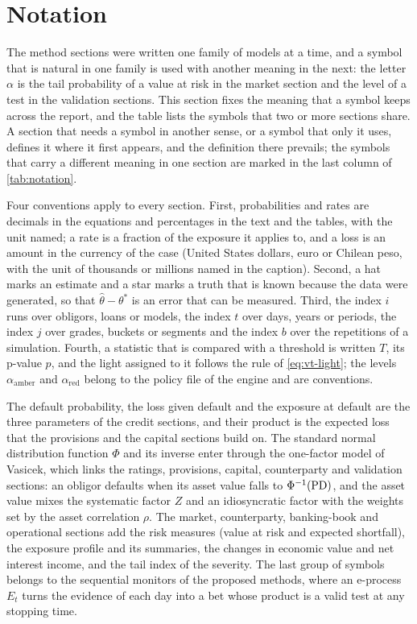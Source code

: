 \section{Notation}
\label{sec:notation}

The method sections were written one family of models at a time, and a symbol that is natural in one family is used with another meaning in the next:
the letter $\alpha$ is the tail probability of a value at risk in the market section and the level of a test in the validation sections. This section fixes the meaning that a symbol keeps across the report, and the table lists the symbols that two or more sections share. A section that
needs a symbol in another sense, or a symbol that only it uses, defines it where it first appears, and the definition there prevails; the symbols that carry a
different meaning in one section are marked in the last column of \cref{tab:notation}.

Four conventions apply to every section. First, probabilities and rates are decimals in the equations and percentages in the text and the tables, with the unit named; a
rate is a fraction of the exposure it applies to, and a loss is an amount in the currency of the case (United States dollars, euro or Chilean peso, with the unit of thousands or millions
named in the caption). Second, a hat marks an estimate and a star marks a truth that is known because the data were generated, so that $\hat\theta-\theta^\ast$ is an error that can be
measured. Third, the index $i$ runs over obligors, loans or models, the index $t$ over days, years or periods, the index $j$ over grades, buckets or segments and the index $b$ over
the repetitions of a simulation. Fourth, a statistic that is compared with a threshold is written $T$, its p-value $p$, and the light assigned to it follows
the rule of \cref{eq:vt-light}; the levels $\alpha_{\mathrm{amber}}$ and $\alpha_{\mathrm{red}}$ belong to the policy file of the engine and are conventions.

The default probability, the loss given default and the exposure at default are the three parameters of the credit sections, and their product is the expected loss that the
provisions and the capital sections build on. The standard normal distribution function $\Phi$ and its inverse enter through the one-factor model of Vasicek, which links the
ratings, provisions, capital, counterparty and validation sections: an obligor defaults when its asset value falls to $\Phi^{-1}(\mathrm{PD})$, and the asset value mixes the systematic
factor $Z$ and an idiosyncratic factor with the weights set by the asset correlation $\rho$. The market, counterparty, banking-book and operational sections add the risk
measures (value at risk and expected shortfall), the exposure profile and its summaries, the changes in economic value and net interest income, and the tail index of the severity.
The last group of symbols belongs to the sequential monitors of the proposed methods, where an e-process $E_t$ turns the evidence of each day into a bet whose product is a
valid test at any stopping time.

